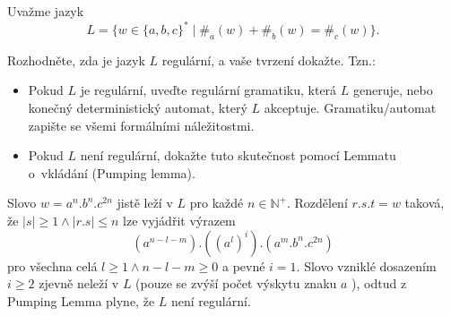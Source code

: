 \documentclass[12pt]{ib102}
\begin{document}
\begin{zadani}
Uvažme jazyk
$$L = \{w \in \{a,b,c\}^*  \mid \#_a(w) + \#_b(w) = \#_c(w) \}.$$

\bigskip

\bigskip

\noindent Rozhodněte, zda je jazyk $L$ regulární, a vaše tvrzení dokažte. Tzn.:
\begin{itemize}
\item Pokud $L$ je regulární, uveďte regulární gramatiku, která $L$ generuje, nebo konečný deterministický automat, který $L$ akceptuje. Gramatiku/automat zapište se všemi formálními náležitostmi.
\item Pokud $L$ není regulární, dokažte tuto skutečnost pomocí Lemmatu o~vkládání (Pumping lemma).
\end{itemize}
\end{zadani}

\begin{reseni}
Slovo \( w = a^n.b^n.c^{2n} \) jistě leží v \( L \) pro každé \( n \in \mathbb{N^+} \). Rozdělení \(r.s.t=w \) taková, že \( \lvert s \rvert \geq 1 \land \lvert r.s \rvert \leq n \) lze vyjádřit výrazem
\begin{equation}
(a^{n-l-m}).((a^l)^i).(a^m.b^n.c^{2n})
\end{equation}
pro všechna celá \(l \geq 1 \land n-l-m \geq 0 \) a pevné \( i = 1 \). Slovo vzniklé dosazením \( i \geq 2 \) zjevně neleží v \( L \) (pouze se zvýší počet výskytu znaku \( a \) ), odtud z Pumping Lemma plyne, že \( L \) není regulární. 
\end{reseni}
\end{document}

